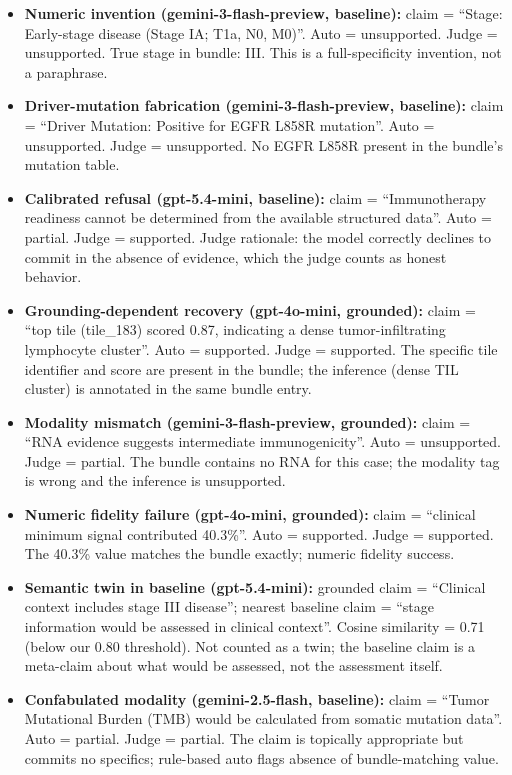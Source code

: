 \documentclass{article}
\theoremstyle{plain}
\begin{document}
\begin{itemize}
\item \textbf{Numeric invention (gemini-3-flash-preview, baseline):} claim = ``Stage: Early-stage disease (Stage IA; T1a, N0, M0)''. Auto = unsupported. Judge = unsupported. True stage in bundle: III. This is a full-specificity invention, not a paraphrase.

\item \textbf{Driver-mutation fabrication (gemini-3-flash-preview, baseline):} claim = ``Driver Mutation: Positive for EGFR L858R mutation''. Auto = unsupported. Judge = unsupported. No EGFR L858R present in the bundle's mutation table.

\item \textbf{Calibrated refusal (gpt-5.4-mini, baseline):} claim = ``Immunotherapy readiness cannot be determined from the available structured data''. Auto = partial. Judge = supported. Judge rationale: the model correctly declines to commit in the absence of evidence, which the judge counts as honest behavior.

\item \textbf{Grounding-dependent recovery (gpt-4o-mini, grounded):} claim = ``top tile (tile\_183) scored 0.87, indicating a dense tumor-infiltrating lymphocyte cluster''. Auto = supported. Judge = supported. The specific tile identifier and score are present in the bundle; the inference (dense TIL cluster) is annotated in the same bundle entry.

\item \textbf{Modality mismatch (gemini-3-flash-preview, grounded):} claim = ``RNA evidence suggests intermediate immunogenicity''. Auto = unsupported. Judge = partial. The bundle contains no RNA for this case; the modality tag is wrong and the inference is unsupported.

\item \textbf{Numeric fidelity failure (gpt-4o-mini, grounded):} claim = ``clinical minimum signal contributed 40.3\%''. Auto = supported. Judge = supported. The 40.3\% value matches the bundle exactly; numeric fidelity success.

\item \textbf{Semantic twin in baseline (gpt-5.4-mini):} grounded claim = ``Clinical context includes stage III disease''; nearest baseline claim = ``stage information would be assessed in clinical context''. Cosine similarity = 0.71 (below our 0.80 threshold). Not counted as a twin; the baseline claim is a meta-claim about what would be assessed, not the assessment itself.

\item \textbf{Confabulated modality (gemini-2.5-flash, baseline):} claim = ``Tumor Mutational Burden (TMB) would be calculated from somatic mutation data''. Auto = partial. Judge = partial. The claim is topically appropriate but commits no specifics; rule-based auto flags absence of bundle-matching value.
\end{itemize}
\end{document}
